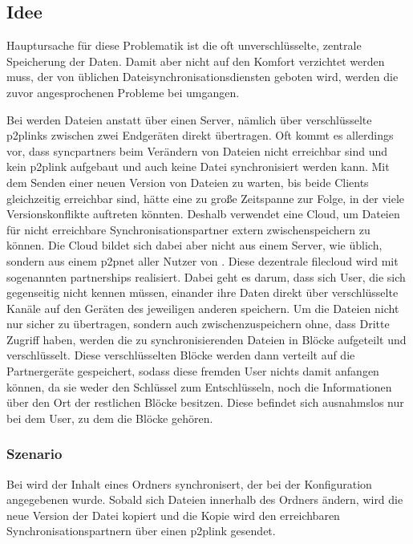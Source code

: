 \subsection{Idee}
Hauptursache für diese Problematik ist die oft unverschlüsselte, zentrale
Speicherung der Daten. Damit aber nicht auf den Komfort verzichtet werden muss,
der von üblichen Dateisynchronisationsdiensten geboten wird, werden die zuvor angesprochenen
Probleme bei \sblit umgangen.

Bei \sblit werden Dateien anstatt über einen Server, nämlich über verschlüsselte
\glspl{p2plink} zwischen zwei Endgeräten direkt übertragen.
Oft kommt es allerdings vor, dass \glspl{syncpartner} beim Verändern von
Dateien nicht erreichbar sind und kein \gls{p2plink} aufgebaut und auch
keine Datei synchronisiert werden kann.
Mit dem Senden einer neuen Version von Dateien zu warten,
bis beide Clients gleichzeitig erreichbar sind, hätte eine zu große Zeitspanne
zur Folge, in der viele Versionskonflikte auftreten könnten.
Deshalb verwendet \sblit eine Cloud, um Dateien für nicht erreichbare
Synchronisationspartner extern zwischenspeichern zu können. Die Cloud bildet
sich dabei aber nicht aus einem Server, wie üblich, sondern aus einem \gls{p2pnet}
aller Nutzer von \sblit. Diese dezentrale \gls{filecloud} wird
mit sogenannten \glspl{partnership} realisiert. Dabei geht es darum, dass sich
User, die sich gegenseitig nicht kennen müssen, einander ihre Daten direkt über
verschlüsselte Kanäle auf den Geräten des jeweiligen anderen speichern.
Um die Dateien nicht nur sicher zu übertragen, sondern auch zwischenzuspeichern
ohne, dass Dritte Zugriff haben, werden die zu
synchronisierenden Dateien in Blöcke aufgeteilt und verschlüsselt. Diese
verschlüsselten Blöcke werden dann verteilt auf die Partnergeräte gespeichert,
sodass diese fremden User nichts damit anfangen können, da sie weder den
Schlüssel zum Entschlüsseln, noch die Informationen über den Ort der restlichen
Blöcke besitzen. Diese befindet sich ausnahmslos nur bei dem User, zu dem die
Blöcke gehören.

\subsubsection{Szenario}
Bei \sblit wird der Inhalt eines Ordners synchronisert, der bei der
Konfiguration angegebenen wurde. Sobald sich Dateien innerhalb des Ordners
ändern, wird die neue Version der Datei kopiert und die Kopie wird den
erreichbaren Synchronisationspartnern über einen \gls{p2plink}
gesendet.

